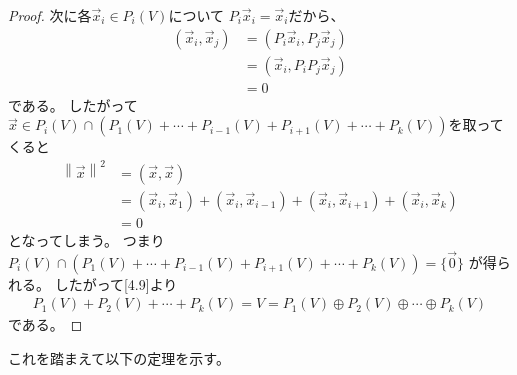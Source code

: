 \documentclass[a4paper, 10pt]{jsarticle}
\begin{document}
\begin{proof}
	次に各$\vec{x}_i \in P_i(V)$について
	$P_i \vec{x}_i = \vec{x}_i$だから、
	\begin{align}
		\left( \vec{x}_i, \vec{x}_j \right)
		&= \left( P_i \vec{x}_i, P_j \vec{x}_j \right) \\
		&= \left( \vec{x}_i, P_i P_j \vec{x}_j \right) \\
		&= 0
	\end{align}
	である。
	したがって
	$\vec{x} \in P_i(V) \cap \left( P_1 (V) + \cdots + P_{i-1}(V) + P_{i+1}(V)
	+ \cdots + P_k(V) \right)$を取ってくると
	\begin{align}
		\left\| \vec{x} \right\|^2
		&= \left( \vec{x}, \vec{x} \right) \\
		&= \left( \vec{x}_i, \vec{x}_1 \right)
		+ \left( \vec{x}_i, \vec{x}_{i-1} \right)
		+ \left( \vec{x}_i, \vec{x}_{i+1} \right)
		+ \left( \vec{x}_i, \vec{x}_k \right) \\
		&= 0
	\end{align}
	となってしまう。
	つまり
	$P_i(V) \cap \left( P_1 (V) + \cdots + P_{i-1}(V) + P_{i+1}(V)
	+ \cdots + P_k(V) \right) = \{ \vec{0} \}$
	が得られる。
	したがって[4.9]より
	\begin{align}
		P_1(V) + P_2(V) + \cdots + P_k(V)
		= V = P_1(V) \oplus P_2(V) \oplus \cdots \oplus P_k(V)
	\end{align}
	である。
\end{proof}

これを踏まえて以下の定理を示す。
\end{document}
